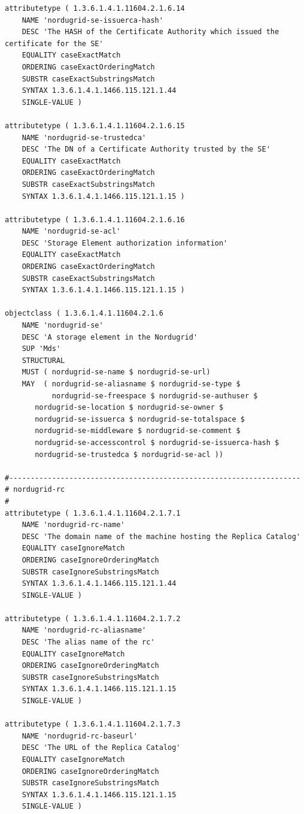 \documentclass{article}
\begin{document}
\begin{verbatim}
attributetype ( 1.3.6.1.4.1.11604.2.1.6.14
    NAME 'nordugrid-se-issuerca-hash'
    DESC 'The HASH of the Certificate Authority which issued the certificate for the SE'
    EQUALITY caseExactMatch
    ORDERING caseExactOrderingMatch
    SUBSTR caseExactSubstringsMatch
    SYNTAX 1.3.6.1.4.1.1466.115.121.1.44 
    SINGLE-VALUE )  

attributetype ( 1.3.6.1.4.1.11604.2.1.6.15
    NAME 'nordugrid-se-trustedca'
    DESC 'The DN of a Certificate Authority trusted by the SE'
    EQUALITY caseExactMatch
    ORDERING caseExactOrderingMatch
    SUBSTR caseExactSubstringsMatch
    SYNTAX 1.3.6.1.4.1.1466.115.121.1.15 )

attributetype ( 1.3.6.1.4.1.11604.2.1.6.16
    NAME 'nordugrid-se-acl'
    DESC 'Storage Element authorization information'
    EQUALITY caseExactMatch
    ORDERING caseExactOrderingMatch
    SUBSTR caseExactSubstringsMatch
    SYNTAX 1.3.6.1.4.1.1466.115.121.1.15 )

objectclass ( 1.3.6.1.4.1.11604.2.1.6
    NAME 'nordugrid-se'
    DESC 'A storage element in the Nordugrid'
    SUP 'Mds'
    STRUCTURAL
    MUST ( nordugrid-se-name $ nordugrid-se-url)
    MAY  ( nordugrid-se-aliasname $ nordugrid-se-type $ 
    	   nordugrid-se-freespace $ nordugrid-se-authuser $
	   nordugrid-se-location $ nordugrid-se-owner $
	   nordugrid-se-issuerca $ nordugrid-se-totalspace $ 
	   nordugrid-se-middleware $ nordugrid-se-comment $
	   nordugrid-se-accesscontrol $ nordugrid-se-issuerca-hash $
	   nordugrid-se-trustedca $ nordugrid-se-acl ))

#--------------------------------------------------------------------
# nordugrid-rc
#
attributetype ( 1.3.6.1.4.1.11604.2.1.7.1
    NAME 'nordugrid-rc-name'
    DESC 'The domain name of the machine hosting the Replica Catalog'
    EQUALITY caseIgnoreMatch
    ORDERING caseIgnoreOrderingMatch
    SUBSTR caseIgnoreSubstringsMatch
    SYNTAX 1.3.6.1.4.1.1466.115.121.1.44
    SINGLE-VALUE )
    
attributetype ( 1.3.6.1.4.1.11604.2.1.7.2
    NAME 'nordugrid-rc-aliasname'
    DESC 'The alias name of the rc'
    EQUALITY caseIgnoreMatch
    ORDERING caseIgnoreOrderingMatch
    SUBSTR caseIgnoreSubstringsMatch
    SYNTAX 1.3.6.1.4.1.1466.115.121.1.15
    SINGLE-VALUE )    

attributetype ( 1.3.6.1.4.1.11604.2.1.7.3
    NAME 'nordugrid-rc-baseurl'
    DESC 'The URL of the Replica Catalog'
    EQUALITY caseIgnoreMatch
    ORDERING caseIgnoreOrderingMatch
    SUBSTR caseIgnoreSubstringsMatch
    SYNTAX 1.3.6.1.4.1.1466.115.121.1.15
    SINGLE-VALUE )   
    

\end{verbatim}
\end{document}

